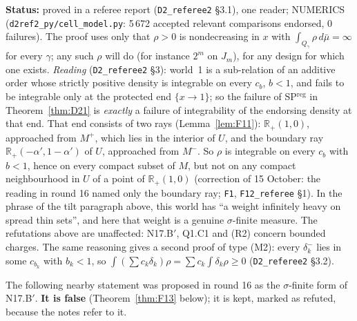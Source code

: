 \documentclass[11pt]{article}
\theoremstyle{definition}
\theoremstyle{remark}
\newcommand{\R}{\mathbb R}
\newcommand{\src}[1]{\texttt{#1}}
\newcommand{\status}[1]{\par\smallskip\noindent\textbf{Status:} #1\par\smallskip}
\begin{document}
\status{proved in a referee report (\src{D2\_referee2} \S3.1), one reader; NUMERICS (\src{d2ref2\_py/cell\_model.py}: 5\,672 accepted relevant comparisons endorsed, 0 failures). The proof uses only that $\rho>0$ is nondecreasing in $x$ with $\int_{Q_\gamma}\rho\,d\bar\mu=\infty$ for every $\gamma$; any such $\rho$ will do (for instance $2^m$ on $J_m$), for any design for which one exists. \emph{Reading} (\src{D2\_referee2} \S3): world~1 is a sub-relation of an additive order whose strictly positive density is integrable on every $c_b$, $b<1$, and fails to be integrable only at the protected end $\{x\to1\}$; so the failure of SP$^{\mathrm{reg}}$ in Theorem~\ref{thm:D21} is \emph{exactly} a failure of integrability of the endorsing density at that end. That end consists of two rays (Lemma~\ref{lem:F11}): $\R_+(1,0)$, approached from $M^+$, which lies in the interior of $U$, and the boundary ray $\R_+(-\alpha',1-\alpha')$ of $U$, approached from $M^-$. So $\rho$ is integrable on every $c_b$ with $b<1$, hence on every compact subset of $M$, but not on any compact neighbourhood in $U$ of a point of $\R_+(1,0)$ (correction of 15 October: the reading in round 16 named only the boundary ray; \src{F1}, \src{F12\_referee} \S1). In the phrase of the tilt paragraph above, this world has ``a weight infinitely heavy on spread thin sets'', and here that weight is a genuine $\sigma$-finite measure. The refutations above are unaffected: N17.B$'$, Q1.C1 and (R2) concern bounded charges. The same reasoning gives a second proof of type (M2): every $\delta_k^-$ lies in some $c_{b_k}$ with $b_k<1$, so $\int(\sum c_k\delta_k)\rho=\sum c_k\int\delta_k\rho\ge0$ (\src{D2\_referee2} \S3.2).}

The following nearby statement was proposed in round 16 as the $\sigma$-finite form of N17.B$'$. \textbf{It is false} (Theorem~\ref{thm:F13} below); it is kept, marked as refuted, because the notes refer to it.
\end{document}
